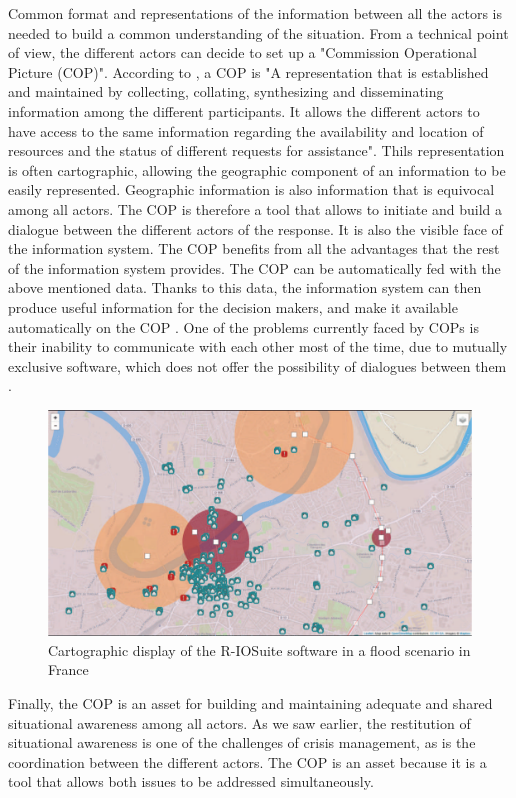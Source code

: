 Common format and representations of the information between all the actors is needed to build a common understanding of the situation.
From a technical point of view, the different actors can decide to set up a "Commission Operational Picture (COP)".
According to \cite{UnitNIMSCommunications}, a COP is "A representation that is established and maintained by collecting, collating, synthesizing and disseminating information among the different participants.
It allows the different actors to have access to the same information regarding the availability and location of resources and the status of different requests for assistance".
Thils representation is often cartographic, allowing the geographic component of an information to be easily represented.
Geographic information is also information that is equivocal among all actors.
The COP is therefore a tool that allows to initiate and build a dialogue between the different actors of the response.
It is also the visible face of the information system.
The COP benefits from all the advantages that the rest of the information system provides.
The COP can be automatically fed with the above mentioned data.
Thanks to this data, the information system can then produce useful information for the decision makers, and make it available automatically on the COP \cite{fertierInterpretationAutomatiqueDonnees2018a}.
One of the problems currently faced by COPs is their inability to communicate with each other most of the time, due to mutually exclusive software, which does not offer the possibility of dialogues between them \cite{opachMapbasedInterfacesCommon2020}.
\begin{figure}[h]
    \centering
    \includegraphics[width=\textwidth]{figures/rio.pdf}
    \caption{Cartographic display of the R-IOSuite software in a flood scenario in France\protect\footnotemark}
    \label{context:cop}
\end{figure}
Finally, the COP is an asset for building and maintaining adequate and shared situational awareness among all actors.
As we saw earlier, the restitution of situational awareness is one of the challenges of crisis management, as is the coordination between the different actors.
The COP is an asset because it is a tool that allows both issues to be addressed simultaneously.

